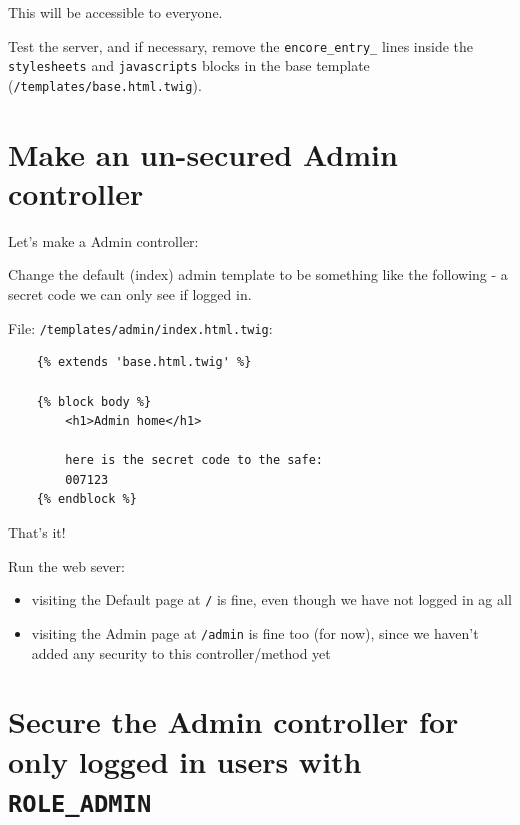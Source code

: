 \documentclass[a4paperpaper,openright]{book}
\newenvironment{Shaded}{}{}
\newcommand{\ExtensionTok}[1]{#1}
\newcommand{\NormalTok}[1]{#1}
\begin{document}
This will be accessible to everyone.

Test the server, and if necessary, remove the \texttt{encore\_entry\_}
lines inside the \texttt{stylesheets} and \texttt{javascripts} blocks in
the base template (\texttt{/templates/base.html.twig}).

\hypertarget{make-an-un-secured-admin-controller}{%
\section{Make an un-secured Admin
controller}\label{make-an-un-secured-admin-controller}}

Let's make a Admin controller:

\begin{Shaded}
\end{Shaded}

Change the default (index) admin template to be something like the
following - a secret code we can only see if logged in.

File: \texttt{/templates/admin/index.html.twig}:

\begin{verbatim}
    {% extends 'base.html.twig' %}

    {% block body %}
        <h1>Admin home</h1>

        here is the secret code to the safe:
        007123
    {% endblock %}
\end{verbatim}

That's it!

Run the web sever:

\begin{itemize}
\item
  visiting the Default page at \texttt{/} is fine, even though we have
  not logged in ag all
\item
  visiting the Admin page at \texttt{/admin} is fine too (for now),
  since we haven't added any security to this controller/method yet
\end{itemize}

\hypertarget{secure-the-admin-controller-for-only-logged-in-users-with-role_admin}{%
\section{\texorpdfstring{Secure the Admin controller for only logged in
users with
\texttt{ROLE\_ADMIN}}{Secure the Admin controller for only logged in users with ROLE\_ADMIN}}\label{secure-the-admin-controller-for-only-logged-in-users-with-role_admin}}
\end{document}
